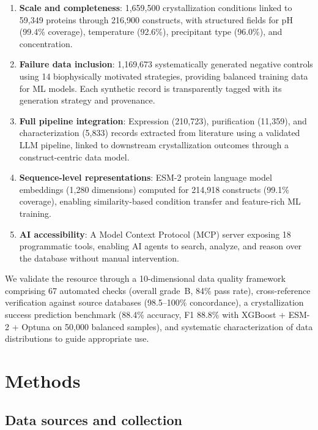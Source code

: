 \documentclass[11pt]{article}
\begin{document}
\begin{enumerate}
  \item \textbf{Scale and completeness}: 1,659,500 crystallization conditions linked to 59,349 proteins through 216,900 constructs, with structured fields for pH (99.4\% coverage), temperature (92.6\%), precipitant type (96.0\%), and concentration.
  \item \textbf{Failure data inclusion}: 1,169,673 systematically generated negative controls using 14 biophysically motivated strategies, providing balanced training data for ML models. Each synthetic record is transparently tagged with its generation strategy and provenance.
  \item \textbf{Full pipeline integration}: Expression (210,723), purification (11,359), and characterization (5,833) records extracted from literature using a validated LLM pipeline, linked to downstream crystallization outcomes through a construct-centric data model.
  \item \textbf{Sequence-level representations}: ESM-2 protein language model embeddings (1,280 dimensions) computed for 214,918 constructs (99.1\% coverage), enabling similarity-based condition transfer and feature-rich ML training.
  \item \textbf{AI accessibility}: A Model Context Protocol (MCP) server exposing 18 programmatic tools, enabling AI agents to search, analyze, and reason over the database without manual intervention.
\end{enumerate}

We validate the resource through a 10-dimensional data quality framework comprising 67 automated checks (overall grade~B, 84\% pass rate), cross-reference verification against source databases (98.5--100\% concordance), a crystallization success prediction benchmark (88.4\% accuracy, F1 88.8\% with XGBoost + ESM-2 + Optuna on 50,000 balanced samples), and systematic characterization of data distributions to guide appropriate use.

\section*{Methods}

\subsection*{Data sources and collection}
\end{document}
